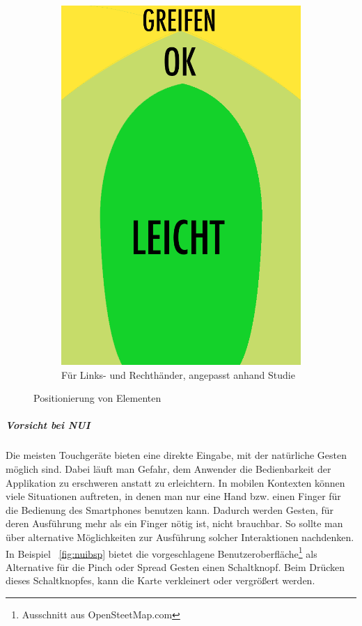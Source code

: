 \begin{figure}
\begin{subfigure}[b]{0.3\textwidth}
	\end{subfigure}
	\begin{subfigure}[b]{0.3\textwidth}
		\centering
			\includegraphics[width=1\textwidth]{img/anordungDerElementeForAll.png}
			\caption{Für Links- und Rechthänder, angepasst anhand Studie \cite{Park:2010tu}}\label{fig:forallPositioning}
			
	\end{subfigure}
	\caption{Positionierung von Elementen}\label{fig:elementPos}
\end{figure}


\subparagraph{Vorsicht bei NUI} 
\label{subp:benutze_nui}

Die meisten Touchgeräte bieten eine direkte Eingabe, mit der natürliche Gesten möglich sind. Dabei läuft man Gefahr, dem Anwender die Bedienbarkeit der Applikation zu erschweren anstatt zu erleichtern. In mobilen Kontexten können viele Situationen auftreten, in denen man nur eine Hand bzw. einen Finger für die Bedienung des Smartphones benutzen kann. Dadurch werden Gesten, für deren Ausführung mehr als ein Finger nötig ist, nicht brauchbar. So sollte man über alternative Möglichkeiten zur Ausführung solcher Interaktionen nachdenken. In Beispiel ~\ref{fig:nuibsp} bietet die vorgeschlagene Benutzeroberfläche\footnote{Ausschnitt aus OpenSteetMap.com} als Alternative für die Pinch oder Spread Gesten einen Schaltknopf. Beim Drücken dieses Schaltknopfes, kann die Karte verkleinert oder vergrößert werden. 

